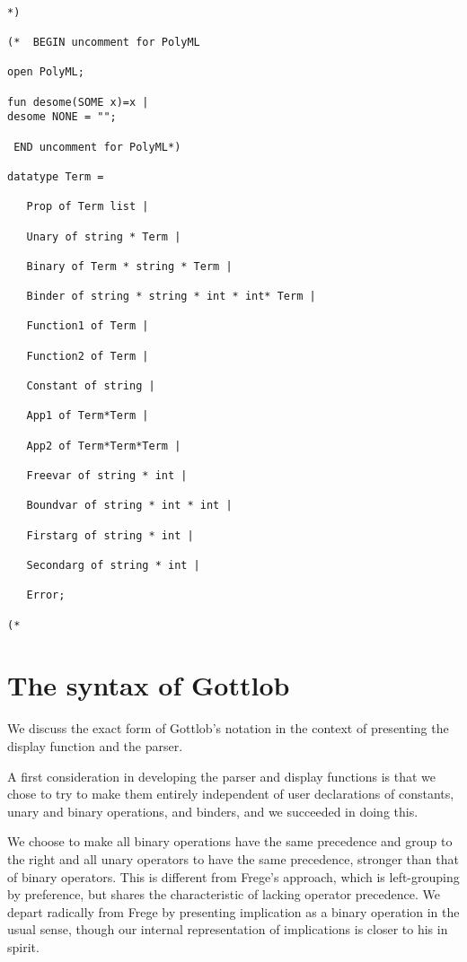 \documentclass{article}
\begin{document}
\begin{verbatim}

*)

(*  BEGIN uncomment for PolyML 

open PolyML;

fun desome(SOME x)=x |
desome NONE = "";

 END uncomment for PolyML*)

datatype Term =

   Prop of Term list |

   Unary of string * Term |

   Binary of Term * string * Term |

   Binder of string * string * int * int* Term |

   Function1 of Term |

   Function2 of Term |

   Constant of string |

   App1 of Term*Term |

   App2 of Term*Term*Term |

   Freevar of string * int |

   Boundvar of string * int * int |

   Firstarg of string * int |

   Secondarg of string * int |

   Error;

(*

\end{verbatim}

\newpage

\section{The syntax of Gottlob}

We discuss the exact form of Gottlob's notation in the context of presenting the display function and the parser.

A first consideration in developing the parser and display functions is that we chose to try to make them entirely independent of user declarations of constants, unary and binary operations, and binders,
and we succeeded in doing this.

We choose to make all binary operations have the same precedence and group to the right and  all unary operators to have the same precedence, stronger than that of binary operators.  This is different from
Frege's approach, which is left-grouping by preference, but shares the characteristic of lacking operator precedence.  We depart radically from Frege by presenting implication
as a binary operation in the usual sense, though our internal representation of implications is closer to his in spirit.
\end{document}
